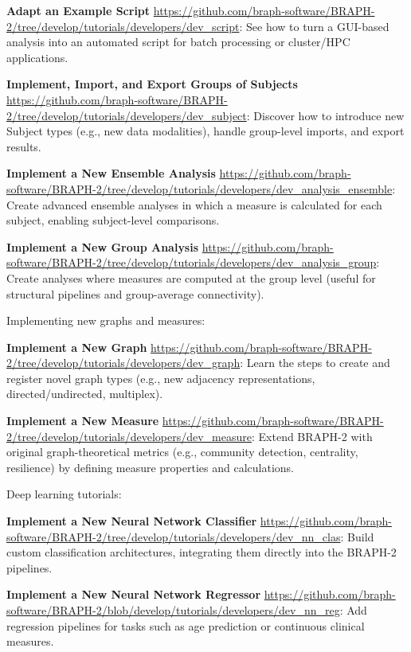 \documentclass[justified]{tufte-handout}
\begin{document}
\textbf{Adapt an Example Script} \url{https://github.com/braph-software/BRAPH-2/tree/develop/tutorials/developers/dev_script}:  
See how to turn a GUI-based analysis into an automated script for batch processing or cluster/HPC applications.

\textbf{Implement, Import, and Export Groups of Subjects} \url{https://github.com/braph-software/BRAPH-2/tree/develop/tutorials/developers/dev_subject}:  
Discover how to introduce new Subject types (e.g., new data modalities), handle group-level imports, and export results.

\textbf{Implement a New Ensemble Analysis} \url{https://github.com/braph-software/BRAPH-2/tree/develop/tutorials/developers/dev_analysis_ensemble}:  
Create advanced ensemble analyses in which a measure is calculated for each subject, enabling subject-level comparisons.

\textbf{Implement a New Group Analysis} \url{https://github.com/braph-software/BRAPH-2/tree/develop/tutorials/developers/dev_analysis_group}:  
Create analyses where measures are computed at the group level (useful for structural pipelines and group-average connectivity).

Implementing new graphs and measures:

\textbf{Implement a New Graph} \url{https://github.com/braph-software/BRAPH-2/tree/develop/tutorials/developers/dev_graph}:  
Learn the steps to create and register novel graph types (e.g., new adjacency representations, directed/undirected, multiplex).

\textbf{Implement a New Measure} \url{https://github.com/braph-software/BRAPH-2/tree/develop/tutorials/developers/dev_measure}:
Extend BRAPH-2 with original graph-theoretical metrics (e.g., community detection, centrality, resilience) by defining measure properties and calculations.

Deep learning tutorials:

\textbf{Implement a New Neural Network Classifier} \url{https://github.com/braph-software/BRAPH-2/tree/develop/tutorials/developers/dev_nn_clas}:
Build custom classification architectures, integrating them directly into the BRAPH-2 pipelines.

\textbf{Implement a New Neural Network Regressor} \url{https://github.com/braph-software/BRAPH-2/blob/develop/tutorials/developers/dev_nn_reg}:  
Add regression pipelines for tasks such as age prediction or continuous clinical measures.
\end{document}
